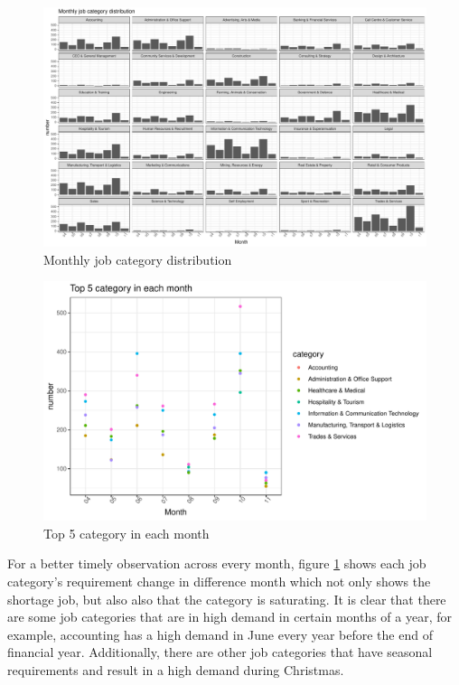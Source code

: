 \documentclass[11pt,a4paper,]{article}
\begin{document}
\begin{figure}
\centering
\includegraphics{Team_JHDP_Assignment4_files/figure-latex/monthly-1.pdf}
\caption{\label{fig:monthly}Monthly job category distribution}
\end{figure}

\begin{figure}
\centering
\includegraphics{Team_JHDP_Assignment4_files/figure-latex/number-1.pdf}
\caption{\label{fig:number}Top 5 category in each month}
\end{figure}

For a better timely observation across every month, figure \ref{fig:monthly} shows each job category's requirement change in difference month which not only shows the shortage job, but also also that the category is saturating. It is clear that there are some job categories that are in high demand in certain months of a year, for example, accounting has a high demand in June every year before the end of financial year. Additionally, there are other job categories that have seasonal requirements and result in a high demand during Christmas.
\end{document}
